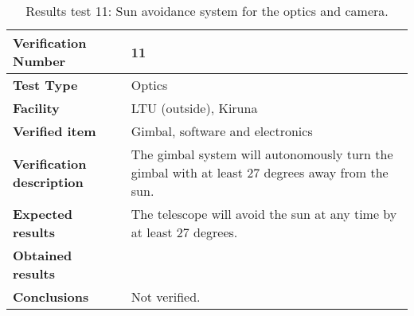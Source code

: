 \begin{table}[H]
\centering

\begin{tabular}{|m{}| m{} |}
\hline
\textbf{Verification Number} 		& 11 					\\ \hline
\textbf{Test Type} 					& Optics				\\ \hline
\textbf{Facility} 					& LTU (outside), Kiruna \\ \hline
\textbf{Verified item} 				& Gimbal, software and electronics \\ \hline

\textbf{Verification description} 	& The gimbal system will autonomously turn the gimbal with at least 27 degrees away from the sun. \\ \hline

\textbf{Expected results} 			& The telescope will avoid the sun at any time by at least 27 degrees. \\ \hline

\textbf{Obtained results} 			& \\ \hline

\textbf{Conclusions} 				& Not verified.		\\ \hline
\end{tabular}
\caption{Results test 11: Sun avoidance system for the optics and camera.}
\label{tab:testresult11:sun}
\end{table}


\raggedbottom
